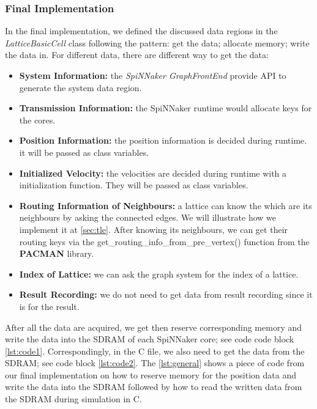 \subsubsection{Final Implementation}
In the final implementation, we defined the discussed data regions in the \textit{LatticeBasicCell} class following the pattern: get the data; allocate memory; write the data in. For different data, there are different way to get the data:

\begin{itemize}
    \item \textbf{System Information:} the \textit{SpiNNaker GraphFrontEnd} provide API to generate the system data region.
    \item \textbf{Transmission Information:} the SpiNNaker runtime would allocate keys for the cores.
    \item \textbf{Position Information:} the position information is decided during runtime. it will be passed as class variables.
    \item \textbf{Initialized Velocity:} the velocities are decided during runtime with a initialization function. They will be passed as class variables. 
    \item \textbf{Routing Information of Neighbours:} a lattice can know the which are its neighbours by asking the connected edges. We will illustrate how we implement it at \ref{sec:tle}. After knowing its neighbours, we can get their routing keys via the get\_routing\_info\_from\_pre\_vertex() function from the \textbf{PACMAN} library.
    \item \textbf{Index of Lattice:} we can ask the graph system for the index of a lattice.
    \item \textbf{Result Recording:} we do not need to get data from result recording since it is for the result.
\end{itemize}

After all the data are acquired, we get then reserve corresponding memory and write the data into the SDRAM of each SpiNNaker core; see code code block \ref{lst:code1}. Correspondingly, in the C file, we also need to get the data from the SDRAM; see code block \ref{lst:code2}. The \ref{lst:general} shows a piece of code from our final implementation on how to reserve memory for the position data and write the data into the SDRAM followed by how to read the written data from the SDRAM during simulation in C.

